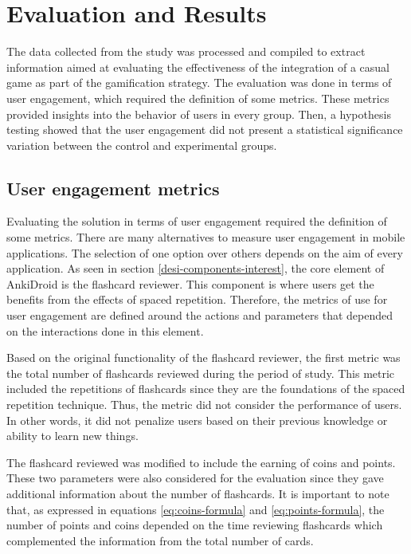 
\chapter{Evaluation and Results} %

\label{resu} %

The data collected from the study was processed and compiled to extract information aimed at evaluating the effectiveness of the integration of a casual game as part of the gamification strategy. The evaluation was done in terms of user engagement, which required the definition of some metrics. These metrics provided insights into the behavior of users in every group. Then, a hypothesis testing showed that the user engagement did not present a statistical significance variation between the control and experimental groups.

\section{User engagement metrics}
Evaluating the solution in terms of user engagement required the definition of some metrics. There are many alternatives to measure user engagement in mobile applications. The selection of one option over others depends on the aim of every application. As seen in section \ref{desi-components-interest}, the core element of AnkiDroid is the flashcard reviewer. This component is where users get the benefits from the effects of spaced repetition. Therefore, the metrics of use for user engagement are defined around the actions and parameters that depended on the interactions done in this element.

Based on the original functionality of the flashcard reviewer, the first metric was the total number of flashcards reviewed during the period of study. This metric included the repetitions of flashcards since they are the foundations of the spaced repetition technique. Thus, the metric did not consider the performance of users. In other words, it did not penalize users based on their previous knowledge or ability to learn new things.

The flashcard reviewed was modified to include the earning of coins and points. These two parameters were also considered for the evaluation since they gave additional information about the number of flashcards. It is important to note that, as expressed in equations \ref{eq:coins-formula} and \ref{eq:points-formula}, the number of points and coins depended on the time reviewing flashcards which complemented the information from the total number of cards.

